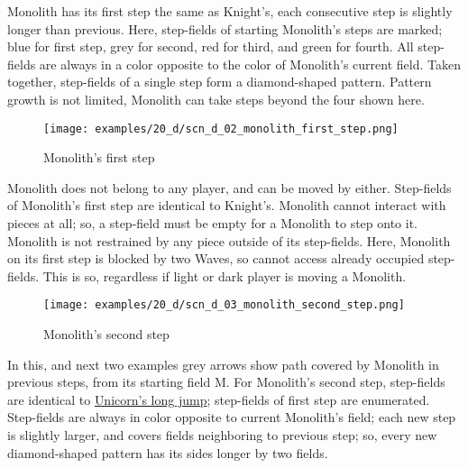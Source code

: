 \vspace*{-0.5\baselineskip}
Monolith has its first step the same as Knight's, each consecutive step is slightly
longer than previous. Here, step-fields of starting Monolith's steps are marked; blue
for first step, grey for second, red for third, and green for fourth. All step-fields
are always in a color opposite to the color of Monolith's current field. Taken together,
step-fields of a single step form a diamond-shaped pattern. Pattern growth is not
limited, Monolith can take steps beyond the four shown here.

\clearpage %

\vspace*{-2.1\baselineskip}
\noindent
\begin{figure}[!h]
\texttt{[image: examples/20\_d/scn\_d\_02\_monolith\_first\_step.png]}
\vspace*{-1.3\baselineskip}
\caption{Monolith's first step}
\label{fig:scn_d_02_monolith_first_step}
\end{figure}

\vspace*{-0.5\baselineskip}
Monolith does not belong to any player, and can be moved by either. Step-fields
of Monolith's first step are identical to Knight's. Monolith cannot interact with
pieces at all; so, a step-field must be empty for a Monolith to step onto it.
Monolith is not restrained by any piece outside of its step-fields. \newline
\indent
Here, Monolith on its first step is blocked by two Waves, so cannot access already
occupied step-fields. This is so, regardless if light or dark player is moving a
Monolith.

\clearpage %

\vspace*{-2.1\baselineskip}
\noindent
\begin{figure}[!h]
\texttt{[image: examples/20\_d/scn\_d\_03\_monolith\_second\_step.png]}
\vspace*{-1.3\baselineskip}
\caption{Monolith's second step}
\label{fig:scn_d_03_monolith_second_step}
\end{figure}

\vspace*{-0.5\baselineskip}
In this, and next two examples grey arrows show path covered by Monolith in previous
steps, from its starting field M. For Monolith's second step, step-fields are identical
to \hyperref[fig:scn_aoa_02_unicorn_opposite_color]{Unicorn's long jump}; step-fields
of first step are enumerated. \newline
\indent
Step-fields are always in color opposite to current Monolith's field; each new step
is slightly larger, and covers fields neighboring to previous step; so, every new
diamond-shaped pattern has its sides longer by two fields.

